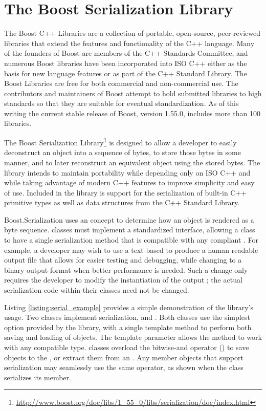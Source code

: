 \section{The Boost Serialization Library}
\label{sec:background_boost}
The Boost C++ Libraries \cite{boost} are a collection of portable, open-source, peer-reviewed libraries that extend the features and functionality of the C++ language. Many of the founders of Boost are members of the C++ Standards Committee, and numerous Boost libraries have been incorporated into ISO C++ either as the basis for new language features or as part of the C++ Standard Library. The Boost Libraries are free for both commercial and non-commercial use. The contributors and maintainers of Boost attempt to hold submitted libraries to high standards so that they are suitable for eventual standardization. As of this writing the current stable release of Boost, version 1.55.0, includes more than 100 libraries.

The Boost Serialization Library\footnote{\url{http://www.boost.org/doc/libs/1_55_0/libs/serialization/doc/index.html}} is designed to allow a developer to easily deconstruct an object into a sequence of bytes, to store those bytes in some manner, and to later reconstruct an equivalent object using the stored bytes. The library intends to maintain portability while depending only on ISO C++ and while taking advantage of modern C++ features to improve simplicity and easy of use. Included in the library is support for the serialization of built-in C++ primitive types as well as data structures from the C++ Standard Library.

Boost.Serialization uses an  concept to determine how an object is rendered as a byte sequence.  classes must implement a standardized interface, allowing a class to have a single serialization method that is compatible with any compliant . For example, a developer may wish to use a text-based  to produce a human readable output file that allows for easier testing and debugging, while changing to a binary output format when better performance is needed. Such a change only requires the developer to modify the instantiation of the output ; the actual serialization code within their classes need not be changed.

Listing \ref{listing:serial_example} provides a simple demonstration of the library's usage. Two classes implement serialization,  and . Both classes use the simplest option provided by the library, with a single template  method to perform both saving and loading of objects. The  template parameter allows the method to work with any compatible  type.  classes overload the bitwise-and operator (\code{\&}) to save objects to the , or extract them from an . Any member objects that support serialization may seamlessly use the same operator, as shown when the  class serializes its  member.

